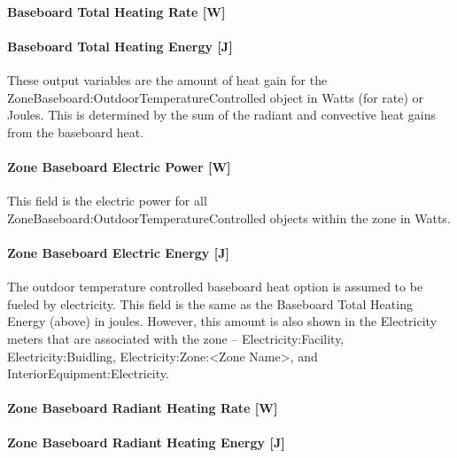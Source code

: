 \paragraph{Baseboard Total Heating Rate {[}W{]}}\label{baseboard-total-heating-rate-w}

\paragraph{Baseboard Total Heating Energy {[}J{]}}\label{baseboard-total-heating-energy-j}

These output variables are the amount of heat gain for the Zone\-Baseboard:\-Outdoor\-Temperature\-Controlled object in Watts (for rate) or Joules. This is determined by the sum of the radiant and convective heat gains from the baseboard heat.

\paragraph{Zone Baseboard Electric Power {[}W{]}}\label{zone-baseboard-electric-power-w}

This field is the electric power for all Zone\-Baseboard:\-Outdoor\-Temperature\-Controlled objects within the zone in Watts.

\paragraph{Zone Baseboard Electric Energy {[}J{]}}\label{zone-baseboard-electric-energy-j}

The outdoor temperature controlled baseboard heat option is assumed to be fueled by electricity. This field is the same as the Baseboard Total Heating Energy (above) in joules. However, this amount is also shown in the Electricity meters that are associated with the zone -- Electricity:\-Facility, Electricity:\-Buidling, Electricity:\-Zone:\-\textless{}Zone Name\textgreater{}, and Interior\-Equipment:\-Electricity.

\paragraph{Zone Baseboard Radiant Heating Rate {[}W{]}}\label{zone-baseboard-radiant-heating-rate-w}

\paragraph{Zone Baseboard Radiant Heating Energy {[}J{]}}\label{zone-baseboard-radiant-heating-energy-j}

